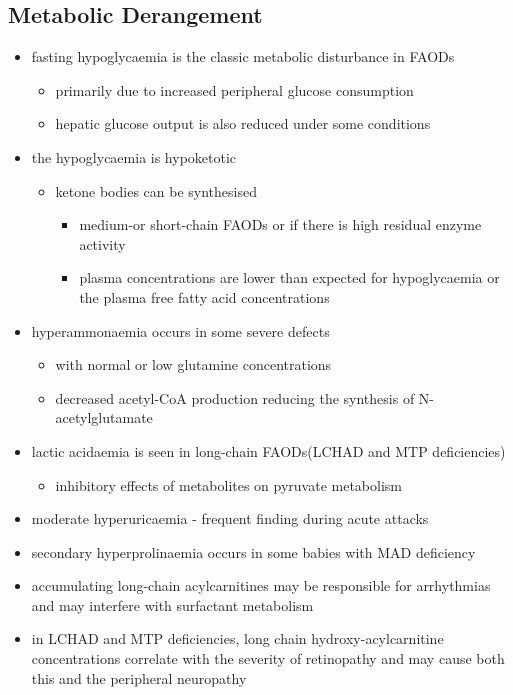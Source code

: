 \documentclass{scrartcl}
\begin{document}
\subsection{Metabolic Derangement}
\label{sec:orgd27238b}
\begin{itemize}
\item fasting hypoglycaemia is the classic metabolic disturbance in FAODs
\begin{itemize}
\item primarily due to increased peripheral glucose consumption
\item hepatic glucose output is also reduced under some conditions
\end{itemize}
\item the hypoglycaemia is hypoketotic
\begin{itemize}
\item ketone bodies can be synthesised
\begin{itemize}
\item medium-or short-chain FAODs or if there is high residual enzyme activity
\item plasma concentrations are lower than expected for hypoglycaemia or the plasma free fatty acid concentrations
\end{itemize}
\end{itemize}
\item hyperammonaemia occurs in some severe defects
\begin{itemize}
\item with normal or low glutamine concentrations
\item decreased acetyl-CoA production reducing the synthesis of N-acetylglutamate
\end{itemize}
\item lactic acidaemia is seen in long-chain FAODs(LCHAD and MTP deficiencies)
\begin{itemize}
\item inhibitory effects of metabolites on pyruvate metabolism
\end{itemize}
\item moderate hyperuricaemia - frequent finding during acute attacks
\item secondary hyperprolinaemia occurs in some babies with MAD deficiency
\item accumulating long-chain acylcarnitines may be responsible for
arrhythmias and may interfere with surfactant metabolism
\item in LCHAD and MTP deficiencies, long chain hydroxy-acylcarnitine
concentrations correlate with the severity of retinopathy and may
cause both this and the peripheral neuropathy
\end{itemize}
\end{document}
